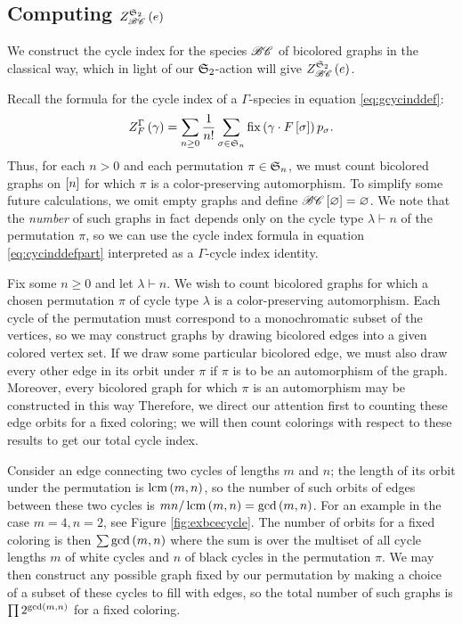 \documentclass[sectionflow,singlespace,twoside,boldmathhdr,draft]{brandiss} %
\numberwithin{section}{chapter}
\numberwithin{figure}{chapter}
\begin{document}
\subsection{Computing $\gci{\symgp{2}}{\specname{BC}} \pbrac{e}$}\label{ss:ecibc}
We construct the cycle index for the species $\specname{BC}$ of bicolored graphs in the classical way, which in light of our $\symgp{2}$-action will give $\gci{\symgp{2}}{\specname{BC}} \pbrac{e}$. 

Recall the formula for the cycle index of a $\Gamma$-species in equation \eqref{eq:gcycinddef}:
\begin{equation*}
  \gci{\Gamma}{F} \pbrac{\gamma} = \sum_{n \geq 0} \frac{1}{n!} \sum_{\sigma \in \symgp{n}} \fix \pbrac{\gamma \cdot F \sbrac{\sigma}} p_{\sigma}.
\end{equation*}
Thus, for each $n > 0$ and each permutation $\pi \in \symgp{n}$, we must count bicolored graphs on $\sbrac{n}$ for which $\pi$ is a color-preserving automorphism.
To simplify some future calculations, we omit empty graphs and define $\specname{BC} \sbrac{\varnothing} = \varnothing$.
We note that the \emph{number} of such graphs in fact depends only on the cycle type $\lambda \vdash n$ of the permutation $\pi$, so we can use the cycle index formula in equation \eqref{eq:cycinddefpart} interpreted as a $\Gamma$-cycle index identity.

Fix some $n \geq 0$ and let $\lambda \vdash n$.
We wish to count bicolored graphs for which a chosen permutation $\pi$ of cycle type $\lambda$ is a color-preserving automorphism.
Each cycle of the permutation must correspond to a monochromatic subset of the vertices, so we may construct graphs by drawing bicolored edges into a given colored vertex set.
If we draw some particular bicolored edge, we must also draw every other edge in its orbit under $\pi$ if $\pi$ is to be an automorphism of the graph.
Moreover, every bicolored graph for which $\pi$ is an automorphism may be constructed in this way
Therefore, we direct our attention first to counting these edge orbits for a fixed coloring; we will then count colorings with respect to these results to get our total cycle index.

Consider an edge connecting two cycles of lengths $m$ and $n$; the length of its orbit under the permutation is $\lcm \pbrac{m, n}$, so the number of such orbits of edges between these two cycles is $mn / \lcm \pbrac{m, n} = \gcd \pbrac{m, n}$.
For an example in the case $m = 4, n = 2$, see Figure \ref{fig:exbcecycle}.
The number of orbits for a fixed coloring is then $\sum \gcd \pbrac{m, n}$ where the sum is over the multiset of all cycle lengths $m$ of white cycles and $n$ of black cycles in the permutation $\pi$.
We may then construct any possible graph fixed by our permutation by making a choice of a subset of these cycles to fill with edges, so the total number of such graphs is $\prod 2^{\gcd \pbrac{m, n}}$ for a fixed coloring.
\end{document}
